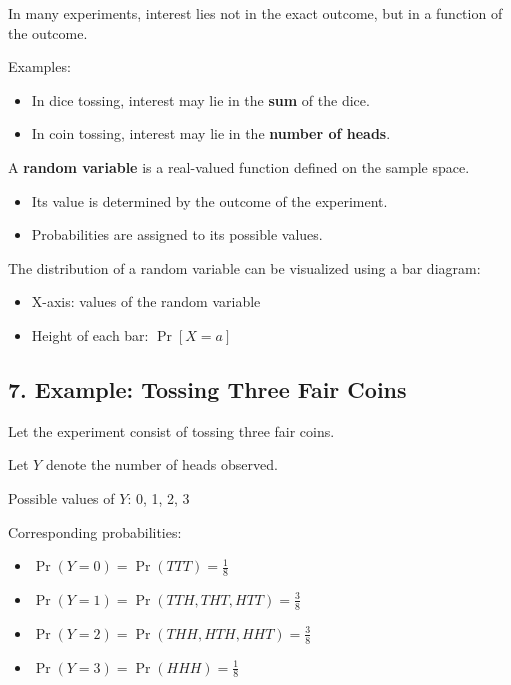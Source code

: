 \documentclass[12pt]{article}
\begin{document}
In many experiments, interest lies not in the exact outcome, but in a function of the outcome.

Examples:

\begin{itemize}
    \item In dice tossing, interest may lie in the \textbf{sum} of the dice.
    \item In coin tossing, interest may lie in the \textbf{number of heads}.
\end{itemize}

A \textbf{random variable} is a real-valued function defined on the sample space.

\begin{itemize}
    \item Its value is determined by the outcome of the experiment.
    \item Probabilities are assigned to its possible values.
\end{itemize}

The distribution of a random variable can be visualized using a bar diagram:

\begin{itemize}
    \item X-axis: values of the random variable
    \item Height of each bar: $\Pr[X = a]$
\end{itemize}

\hrulefill

\subsection*{7. Example: Tossing Three Fair Coins}

Let the experiment consist of tossing three fair coins.

Let $Y$ denote the number of heads observed.

Possible values of $Y$: 0, 1, 2, 3

Corresponding probabilities:

\begin{itemize}
    \item $\Pr(Y = 0) = \Pr(TTT) = \frac{1}{8}$
    \item $\Pr(Y = 1) = \Pr(TTH, THT, HTT) = \frac{3}{8}$
    \item $\Pr(Y = 2) = \Pr(THH, HTH, HHT) = \frac{3}{8}$
    \item $\Pr(Y = 3) = \Pr(HHH) = \frac{1}{8}$
\end{itemize}
\end{document}
